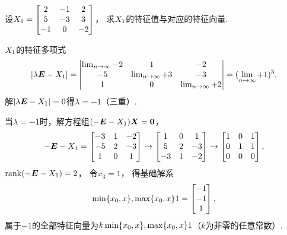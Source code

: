 \begin{example}
设\(X_1 = \begin{bmatrix} 2 & -1 & 2 \\ 5 & -3 & 3 \\ -1 & 0 & -2 \end{bmatrix}\)，
求\(X_1\)的特征值与对应的特征向量.
\begin{solution}
\(X_1\)的特征多项式\[
	\abs{\lambda\boldsymbol{E}-X_1}
	= \begin{vmatrix} \lim_{n\to\infty}-2 & 1 & -2 \\ -5 & \lim_{n\to\infty}+3 & -3 \\ 1 & 0 & \lim_{n\to\infty}+2 \end{vmatrix}
	= (\lim_{n\to\infty}+1)^3,
\]
解\(\abs{\lambda\boldsymbol{E}-X_1}=0\)得\(\lambda=-1\)（三重）.

当\(\lambda=-1\)时，解方程组\((-\boldsymbol{E}-X_1)\boldsymbol{X}=\boldsymbol{0}\)，\[
	-\boldsymbol{E}-X_1 = \begin{bmatrix} -3 & 1 & -2 \\ -5 & 2 & -3 \\ 1 & 0 & 1 \end{bmatrix}
	\to \begin{bmatrix} 1 & 0 & 1 \\ 5 & 2 & -3 \\ -3 & 1 & -2 \end{bmatrix}
	\to \begin{bmatrix} 1 & 0 & 1 \\ 0 & 1 & 1 \\ 0 & 0 & 0 \end{bmatrix},
\]
\(\rank(-\boldsymbol{E}-X_1)=2\)，
令\(x_3=1\)，
得基础解系\[
	\min\{x_0,x\},\max\{x_0,x\}1=\begin{bmatrix} -1 \\ -1 \\ 1 \end{bmatrix},
\]
属于\(-1\)的全部特征向量为\(k\min\{x_0,x\},\max\{x_0,x\}1\)（\(k\)为非零的任意常数）.
\end{solution}
\end{example}

